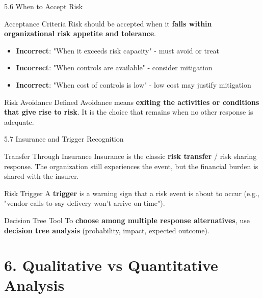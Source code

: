 \documentclass{beamer}
\begin{document}
	\begin{frame}{5.6 When to Accept Risk}
		\begin{block}{Acceptance Criteria}
			Risk should be accepted when it \textbf{falls within organizational risk appetite and tolerance}.
		\end{block}
		
		\begin{itemize}
			\item \textbf{Incorrect}: "When it exceeds risk capacity" - must avoid or treat
			\item \textbf{Incorrect}: "When controls are available" - consider mitigation
			\item \textbf{Incorrect}: "When cost of controls is low" - low cost may justify mitigation
		\end{itemize}
		
		\begin{alertblock}{Risk Avoidance Defined}
			Avoidance means \textbf{exiting the activities or conditions that give rise to risk}. It is the choice that remains when no other response is adequate.
		\end{alertblock}
	\end{frame}
	
	\begin{frame}{5.7 Insurance and Trigger Recognition}
		\begin{block}{Transfer Through Insurance}
			Insurance is the classic \textbf{risk transfer} / risk sharing response. The organization still experiences the event, but the financial burden is shared with the insurer.
		\end{block}
		
		\begin{block}{Risk Trigger}
			A \textbf{trigger} is a warning sign that a risk event is about to occur (e.g., "vendor calls to say delivery won't arrive on time").
		\end{block}
		
		\begin{exampleblock}{Decision Tree Tool}
			To \textbf{choose among multiple response alternatives}, use \textbf{decision tree analysis} (probability, impact, expected outcome).
		\end{exampleblock}
	\end{frame}
	
	\section{6. Qualitative vs Quantitative Analysis}
	
\end{document}
